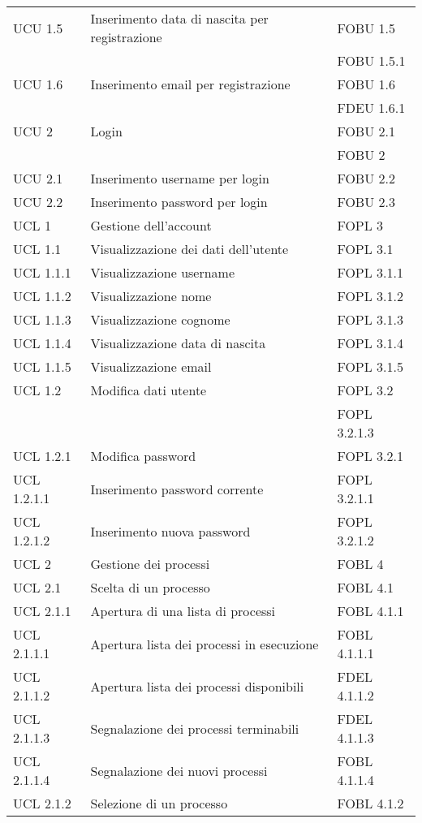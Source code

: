 \begin{longtable}{lXp{}}
\midrule 
UCU 1.5&Inserimento data di nascita per registrazione&FOBU 1.5\\ 
&&FOBU 1.5.1\\ 
\midrule 
UCU 1.6&Inserimento email per registrazione&FOBU 1.6\\ 
&&FDEU 1.6.1\\ 
\midrule 
UCU 2&Login&FOBU 2.1\\ 
&&FOBU 2\\ 
\midrule 
UCU 2.1&Inserimento username per login&FOBU 2.2\\ 
\midrule 
UCU 2.2&Inserimento password per login&FOBU 2.3\\ 
\midrule 
UCL 1&Gestione dell'account&FOPL 3\\ 
\midrule 
UCL 1.1&Visualizzazione dei dati dell'utente&FOPL 3.1\\ 
\midrule 
UCL 1.1.1&Visualizzazione username&FOPL 3.1.1\\ 
\midrule 
UCL 1.1.2&Visualizzazione nome&FOPL 3.1.2\\ 
\midrule 
UCL 1.1.3&Visualizzazione cognome&FOPL 3.1.3\\ 
\midrule 
UCL 1.1.4&Visualizzazione data di nascita&FOPL 3.1.4\\ 
\midrule
UCL 1.1.5&Visualizzazione email&FOPL 3.1.5\\ 
\midrule
UCL 1.2&Modifica dati utente&FOPL 3.2\\ 
&&FOPL 3.2.1.3\\
\midrule 
UCL 1.2.1&Modifica password&FOPL 3.2.1\\ 
\midrule 
UCL 1.2.1.1&Inserimento password corrente&FOPL 3.2.1.1\\ 
\midrule 
UCL 1.2.1.2&Inserimento nuova password&FOPL 3.2.1.2\\ 
\midrule 
UCL 2&Gestione dei processi&FOBL 4\\ 
\midrule 
UCL 2.1&Scelta di un processo&FOBL 4.1\\
\midrule
UCL 2.1.1&Apertura di una lista di processi&FOBL 4.1.1\\ 
\midrule 
UCL 2.1.1.1&Apertura lista dei processi in esecuzione&FOBL 4.1.1.1\\ 
\midrule 
UCL 2.1.1.2&Apertura lista dei processi disponibili&FDEL 4.1.1.2\\ 
\midrule 
UCL 2.1.1.3&Segnalazione dei processi terminabili&FDEL 4.1.1.3\\ 
\midrule 
UCL 2.1.1.4&Segnalazione dei nuovi processi&FOBL 4.1.1.4\\ 
\midrule 
UCL 2.1.2&Selezione di un processo&FOBL 4.1.2\\ 

\end{longtable}
